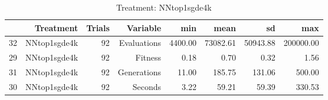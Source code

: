 \begin{table}[ht]
\centering
\begin{tabular}{rrrrrrrr}
  \hline
 & Treatment & Trials & Variable & min & mean & sd & max \\ 
  \hline
32 & NNtop1sgde4k &  92 & Evaluations & 4400.00 & 73082.61 & 50943.88 & 200000.00 \\ 
  29 & NNtop1sgde4k &  92 & Fitness & 0.18 & 0.70 & 0.32 & 1.56 \\ 
  31 & NNtop1sgde4k &  92 & Generations & 11.00 & 185.75 & 131.06 & 500.00 \\ 
  30 & NNtop1sgde4k &  92 & Seconds & 3.22 & 59.21 & 59.39 & 330.53 \\ 
   \hline
\end{tabular}
\caption{Treatment: NNtop1sgde4k} 
\end{table}
